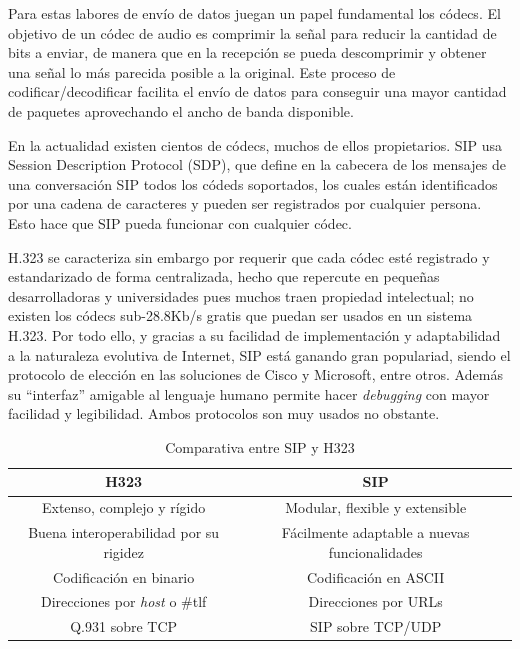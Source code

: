 \documentclass[a4paper, 12pt]{book}
\begin{document}
Para estas labores de envío de datos juegan un papel fundamental los códecs. El objetivo de un códec de audio es comprimir la señal para reducir la cantidad de bits a enviar, de manera que en la recepción se pueda descomprimir y obtener una señal lo más parecida posible a la original. Este proceso de codificar/decodificar facilita el envío de datos para conseguir una mayor cantidad de paquetes aprovechando el ancho de banda disponible.

En la actualidad existen cientos de códecs, muchos de ellos propietarios. SIP usa Session Description Protocol (SDP), que define en la cabecera de los mensajes de una conversación SIP todos los códeds soportados, los cuales están identificados por una cadena de caracteres y pueden ser registrados por cualquier persona. Esto hace que SIP pueda funcionar con cualquier códec.

H.323 se caracteriza sin embargo por requerir que cada códec esté registrado y estandarizado de forma centralizada, hecho que repercute en pequeñas desarrolladoras y universidades pues muchos traen propiedad intelectual; no existen los códecs sub-28.8Kb/s gratis que puedan ser usados en un sistema H.323. Por todo ello, y gracias a su facilidad de implementación y adaptabilidad a la naturaleza evolutiva de Internet, SIP está ganando gran populariad, siendo el protocolo de elección en las soluciones de Cisco y Microsoft, entre otros. Además su  ``interfaz'' amigable al lenguaje humano permite hacer \emph{debugging} con mayor facilidad y legibilidad.
Ambos protocolos son muy usados no obstante.
\\

\begin{table} [h]
  \begin{center}
    \begin{tabular}{| c | c |}
    \hline
    \textbf{H323} & \textbf{SIP} \\ \hline
    Extenso, complejo y rígido & Modular, flexible y extensible\\\hline
    Buena interoperabilidad por su rigidez & Fácilmente adaptable a nuevas funcionalidades\\\hline
    Codificación en binario & Codificación en ASCII \\\hline
    Direcciones por \emph{host} o \#tlf & Direcciones por URLs \\ \hline
    Q.931 sobre TCP & SIP sobre TCP/UDP \\\hline
    \end{tabular}
    \label{tabla:SIPvsH323}
    \caption{Comparativa entre SIP y H323}
  \end{center}
\end{table}
\end{document}
